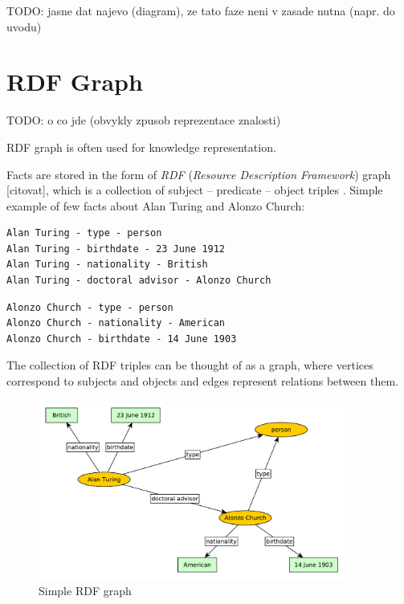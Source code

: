 \documentclass[a4paper, 12pt, twoside]{fithesis2}		%
\renewcommand{\_}{\leavevmode \kern0.0em\vbox{\hrule width0.4em}}
\begin{document}
TODO: jasne dat najevo (diagram), ze tato faze neni v zasade nutna (napr. do uvodu)


\section{RDF Graph}
\label{sec:rdf-graph}

TODO: o co jde (obvykly zpusob reprezentace znalosti)


RDF graph is often used for knowledge representation.

Facts are stored in the form of \textit{RDF} (\textit{Resource Description Framework}) graph [citovat],
which is a collection of subject -- predicate -- object triples \parencite[][63]{semantic-web}. Simple example of few facts about Alan Turing and Alonzo Church:


\begin{verbatim}
Alan Turing - type - person
Alan Turing - birthdate - 23 June 1912
Alan Turing - nationality - British
Alan Turing - doctoral advisor - Alonzo Church
\end{verbatim}

\begin{verbatim}
Alonzo Church - type - person
Alonzo Church - nationality - American
Alonzo Church - birthdate - 14 June 1903
\end{verbatim}

The collection of RDF triples can be thought of as a graph,
where vertices correspond to subjects and objects
and edges represent relations between them.

\begin{figure}[h]
  \centering
  \includegraphics[width=0.9\textwidth]{images/rdf-graph.pdf}
  \caption{Simple RDF graph}
  \label{fig:simple-rdf-graph}
\end{figure}
\end{document}
